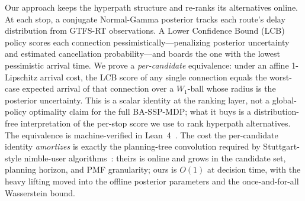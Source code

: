 \documentclass[11pt]{article}
\theoremstyle{definition}
\theoremstyle{remark}
\begin{document}
Our approach keeps the hyperpath structure and re-ranks its alternatives online. At each stop, a conjugate Normal-Gamma posterior tracks each route's delay distribution from GTFS-RT observations. A Lower Confidence Bound (LCB) policy scores each connection pessimistically---penalizing posterior uncertainty and estimated cancellation probability---and boards the one with the lowest pessimistic arrival time. We prove a \emph{per-candidate} equivalence: under an affine 1-Lipschitz arrival cost, the LCB score of any single connection equals the worst-case expected arrival of that connection over a $W_1$-ball whose radius is the posterior uncertainty. This is a scalar identity at the ranking layer, not a global-policy optimality claim for the full BA-SSP-MDP; what it buys is a distribution-free interpretation of the per-stop score we use to rank hyperpath alternatives. The equivalence is machine-verified in Lean~4~\cite{lean4}. The cost the per-candidate identity \emph{amortizes} is exactly the planning-tree convolution required by Stuttgart-style nimble-user algorithms~\cite{durner2024}: theirs is online and grows in the candidate set, planning horizon, and PMF granularity; ours is $O(1)$ at decision time, with the heavy lifting moved into the offline posterior parameters and the once-and-for-all Wasserstein bound.
\end{document}
